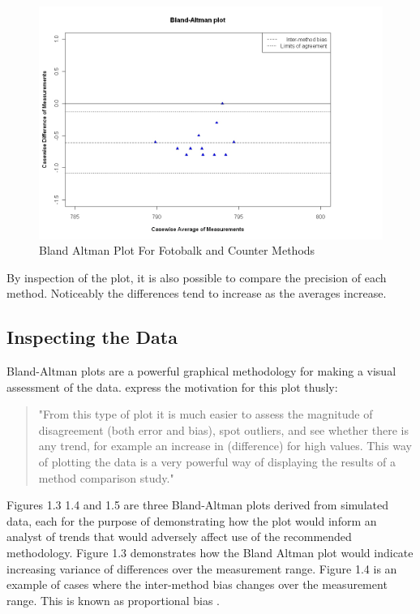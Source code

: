 \documentclass[12pt, a4paper]{report}
\begin{document}
	
	\begin{figure}[h!]
		\begin{center}
			\includegraphics[width=120mm]{images/GrubbsBAplot.jpeg}
			\caption{Bland Altman Plot For Fotobalk and Counter Methods}\label{GrubbsBA}
		\end{center}
	\end{figure}
	
	\newpage
	By inspection of the plot, it is also possible to compare the precision of each method. Noticeably the differences tend to
	increase as the averages increase.
	
	\subsection{Inspecting the Data}
	Bland-Altman plots are a powerful graphical methodology for making a visual assessment of the data. \citet*{BA83} express the motivation for this plot thusly:
	\begin{quote}
		"From this type of plot it is much easier to assess the magnitude
		of disagreement (both error and bias), spot outliers, and see
		whether there is any trend, for example an increase in
		(difference) for high values. This way of plotting the data is a
		very powerful way of displaying the results of a method comparison
		study."
	\end{quote}
	
	
	Figures 1.3 1.4 and 1.5 are three Bland-Altman plots derived from
	simulated data, each for the purpose of demonstrating how the plot
	would inform an analyst of trends that would adversely affect use
	of the recommended methodology. Figure 1.3 demonstrates how the
	Bland Altman plot would indicate increasing variance of
	differences over the measurement range. Figure 1.4 is an example
	of cases where the inter-method bias changes over the measurement
	range. This is known as proportional bias \citep{ludbrook97}.
	
\end{document}
